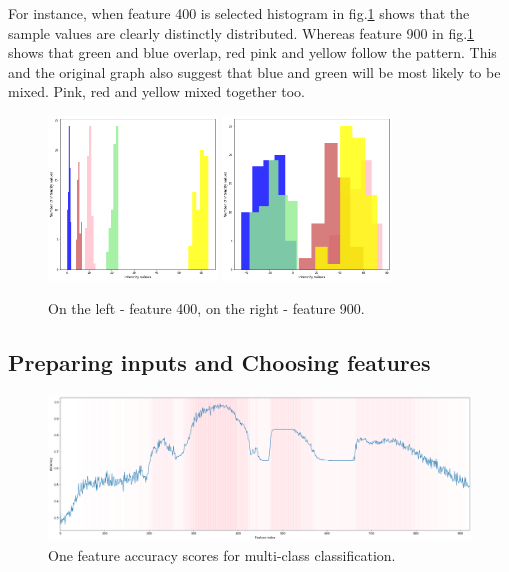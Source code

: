 \documentclass[11pt]{article}
\begin{document}
			For instance, when feature 400 is selected histogram in fig.\ref{fig:400_900} shows that the sample values are clearly distinctly distributed. Whereas feature 900 in fig.\ref{fig:400_900} shows that green and blue overlap, red pink and yellow follow the pattern. This and the original graph also suggest that blue and green will be most likely to be mixed. Pink, red and yellow mixed together too. 

		\begin{figure}
			\hfill
				\includegraphics[width=0.4\textwidth]{png/400_multi.png}
			\hfill
				\includegraphics[width=0.4\textwidth]{png/900_multi.png}
			\hfill
			\caption{On the left - feature 400, on the right - feature 900.}
			\label{fig:400_900}
		\end{figure}

		\subsection{Preparing inputs and Choosing features}
			\begin{figure}[H]
				\includegraphics[width=1\textwidth]{png/multi_one}
				\caption{One feature accuracy scores for multi-class classification.}
				\label{fig:multi_one}
			\end{figure}
\end{document}
